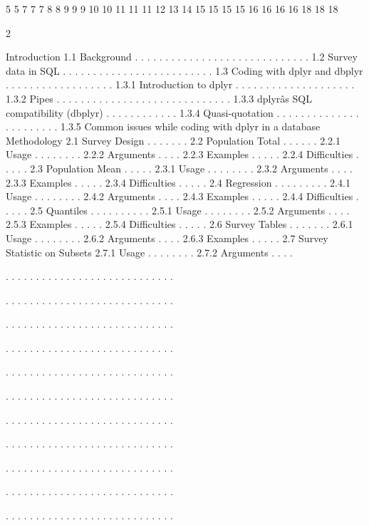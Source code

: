 5
5
7
7
7
8
8
9
9
9
10
10
11
11
11
12
13
14
15
15
15
15
16
16
16
16
18
18
18

2

Introduction
1.1 Background . . . . . . . . . . . . . . . . . . . . . . . . . . . . .
1.2 Survey data in SQL . . . . . . . . . . . . . . . . . . . . . . . . .
1.3 Coding with dplyr and dbplyr . . . . . . . . . . . . . . . . . .
1.3.1 Introduction to dplyr . . . . . . . . . . . . . . . . . . . .
1.3.2 Pipes . . . . . . . . . . . . . . . . . . . . . . . . . . . . .
1.3.3 dplyrâs SQL compatibility (dbplyr) . . . . . . . . . . . .
1.3.4 Quasi-quotation . . . . . . . . . . . . . . . . . . . . . . .
1.3.5 Common issues while coding with dplyr in a database
Methodology
2.1 Survey Design . . . . . . .
2.2 Population Total . . . . . .
2.2.1 Usage . . . . . . . .
2.2.2 Arguments . . . .
2.2.3 Examples . . . . .
2.2.4 Difficulties . . . . .
2.3 Population Mean . . . . .
2.3.1 Usage . . . . . . . .
2.3.2 Arguments . . . .
2.3.3 Examples . . . . .
2.3.4 Difficulties . . . . .
2.4 Regression . . . . . . . . .
2.4.1 Usage . . . . . . . .
2.4.2 Arguments . . . .
2.4.3 Examples . . . . .
2.4.4 Difficulties . . . . .
2.5 Quantiles . . . . . . . . . .
2.5.1 Usage . . . . . . . .
2.5.2 Arguments . . . .
2.5.3 Examples . . . . .
2.5.4 Difficulties . . . . .
2.6 Survey Tables . . . . . . .
2.6.1 Usage . . . . . . . .
2.6.2 Arguments . . . .
2.6.3 Examples . . . . .
2.7 Survey Statistic on Subsets
2.7.1 Usage . . . . . . . .
2.7.2 Arguments . . . .

.
.
.
.
.
.
.
.
.
.
.
.
.
.
.
.
.
.
.
.
.
.
.
.
.
.
.
.

.
.
.
.
.
.
.
.
.
.
.
.
.
.
.
.
.
.
.
.
.
.
.
.
.
.
.
.

.
.
.
.
.
.
.
.
.
.
.
.
.
.
.
.
.
.
.
.
.
.
.
.
.
.
.
.

.
.
.
.
.
.
.
.
.
.
.
.
.
.
.
.
.
.
.
.
.
.
.
.
.
.
.
.

.
.
.
.
.
.
.
.
.
.
.
.
.
.
.
.
.
.
.
.
.
.
.
.
.
.
.
.

.
.
.
.
.
.
.
.
.
.
.
.
.
.
.
.
.
.
.
.
.
.
.
.
.
.
.
.

.
.
.
.
.
.
.
.
.
.
.
.
.
.
.
.
.
.
.
.
.
.
.
.
.
.
.
.

.
.
.
.
.
.
.
.
.
.
.
.
.
.
.
.
.
.
.
.
.
.
.
.
.
.
.
.

.
.
.
.
.
.
.
.
.
.
.
.
.
.
.
.
.
.
.
.
.
.
.
.
.
.
.
.

.
.
.
.
.
.
.
.
.
.
.
.
.
.
.
.
.
.
.
.
.
.
.
.
.
.
.
.

.
.
.
.
.
.
.
.
.
.
.
.
.
.
.
.
.
.
.
.
.
.
.
.
.
.
.
.

